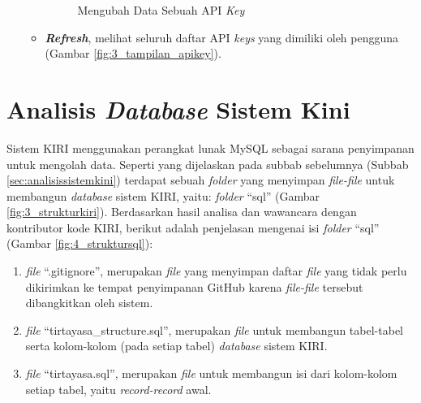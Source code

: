\begin{enumerate}
\begin{itemize}
\begin{figure}[htbp]
			\caption{Mengubah Data Sebuah API \textit{Key}}
			\label{fig:3_tampilan_editapikey}
		\end{figure}
		\item \textbf{\textit{Refresh}}, melihat seluruh daftar API \textit{keys} yang dimiliki oleh pengguna (Gambar \ref{fig:3_tampilan_apikey}).
	\end{itemize}
	
\end{enumerate}


\section{Analisis \textit{Database} Sistem Kini}
\label{sec:analisisdatabasesistemkini}
Sistem KIRI menggunakan perangkat lunak MySQL sebagai sarana penyimpanan untuk mengolah data. Seperti yang dijelaskan pada subbab sebelumnya (Subbab \ref{sec:analisissistemkini}) terdapat sebuah \textit{folder} yang menyimpan \textit{file-file} untuk membangun \textit{database} sistem KIRI, yaitu: \textit{folder} ``sql'' (Gambar \ref{fig:3_strukturkiri}). Berdasarkan hasil analisa dan wawancara dengan kontributor kode KIRI, berikut adalah penjelasan mengenai isi \textit{folder} ``sql'' (Gambar \ref{fig:4_struktursql}):
\begin{enumerate}
	\item \textit{file} ``.gitignore'', merupakan \textit{file} yang menyimpan daftar \textit{file} yang tidak perlu dikirimkan ke tempat penyimpanan GitHub karena \textit{file-file} tersebut dibangkitkan oleh sistem.
	\item \textit{file} ``tirtayasa\_structure.sql'', merupakan \textit{file} untuk membangun tabel-tabel serta kolom-kolom (pada setiap tabel) \textit{database} sistem KIRI.
	\item \textit{file} ``tirtayasa.sql'', merupakan \textit{file} untuk membangun isi dari kolom-kolom setiap tabel, yaitu \textit{record-record} awal.
\end{enumerate}

